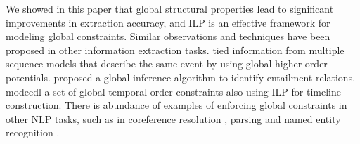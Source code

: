 
 
We showed in this paper that global structural properties lead to significant improvements in extraction accuracy, and ILP is an effective framework for modeling global constraints. Similar observations and techniques have been proposed in other information extraction tasks. 
 tied information from multiple sequence models that describe the same event by using global higher-order potentials. 
 proposed a global inference algorithm to identify entailment relations. 
 modeedl a set of global temporal order constraints also using ILP for timeline construction. 
There is abundance of examples of enforcing global constraints in other NLP tasks, such as in coreference resolution \cite{Finkel08}, parsing \cite{Rush12} and named entity recognition \cite{Wang13}.
